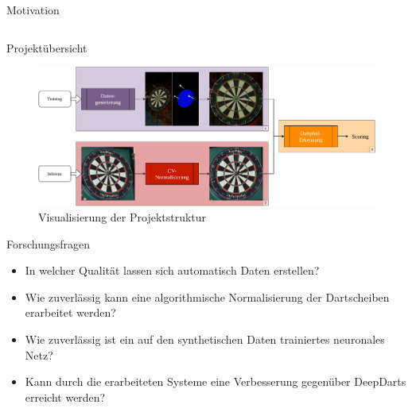 \begin{frame}{Motivation}
\begin{columns}
\begin{column}{0.4\linewidth}
        \end{column}
    \end{columns}

    \vspace*{-0.2cm}


\end{frame}

\begin{frame}{Projektübersicht}
    \begin{figure}
        \centering
        \includegraphics[height=0.8\textheight]{imgs/ma_project_structure.pdf}
        \caption{Visualisierung der Projektstruktur}
    \end{figure}
\end{frame}

\begin{frame}{Forschungsfragen}
    \begin{itemize}
        \item<1-> In welcher Qualität lassen sich automatisch Daten erstellen?
        \item<2-> Wie zuverlässig kann eine algorithmische Normalisierung der Dartscheiben erarbeitet werden?
        \item<3-> Wie zuverlässig ist ein auf den synthetischen Daten trainiertes neuronales Netz?
        \item<4-> Kann durch die erarbeiteten Systeme eine Verbesserung gegenüber DeepDarts erreicht werden?
    \end{itemize}
\end{frame}